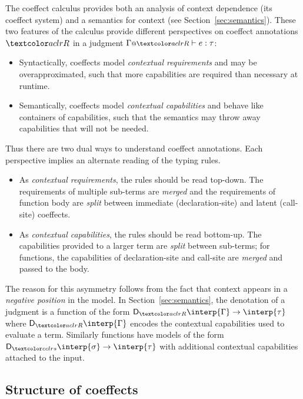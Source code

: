 The coeffect calculus provides both an analysis of
context dependence (its coeffect system) and a semantics for
context (see Section~\ref{sec:semantics}). These two features of the calculus provide different
perspectives on coeffect annotations $\aclrd{R}$ in a judgment $\coctx{\Gamma}{\aclrd{R}} \vdash e : \tau$:
\begin{itemize}
\item Syntactically, coeffects model \emph{contextual requirements} and 
  may be overapproximated, such that more capabilities are required 
  than necessary at runtime.

\item Semantically, coeffects model \emph{contextual capabilities} and behave 
  like containers of capabilities, such that the semantics may throw away 
  capabilities that will not be needed.
\end{itemize}
%
Thus there are two dual ways to understand coeffect annotations. Each
perspective implies an alternate reading of the typing rules.
%
\begin{itemize}
\item
As \emph{contextual requirements}, the rules should be read top-down.
The requirements of multiple sub-terms are \emph{merged} and the
requirements of function body are \emph{split} between immediate (declaration-site)
and latent (call-site) coeffects.

\item
As \emph{contextual capabilities}, the rules should be read bottom-up.
The capabilities provided to a larger term are \emph{split} between 
sub-terms; for functions, the capabilities of declaration-site and call-site
are \emph{merged} and passed to the body.
\end{itemize}
%
The reason for this asymmetry follows from the fact that context appears in a \emph{negative
position} in the model. In Section~\ref{sec:semantics}, the denotation of a judgment
is a function of the form $\D_{\aclrd{R}} \interp{\Gamma} \rightarrow \interp{\tau}$ where $\D_{\aclrd{R}} \interp{\Gamma}$ 
encodes the contextual capabilities used to evaluate a term. Similarly
functions have models of the form $\D_{\cclrd{s}} \interp{\sigma} \rightarrow \interp{\tau}$
with additional contextual capabilities attached to the input.

\subsection{Structure of coeffects}

